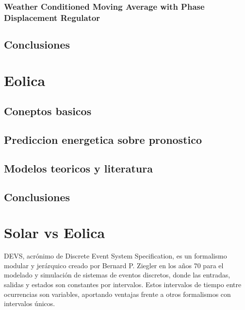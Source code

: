 \subsubsection{ Weather Conditioned Moving Average with Phase Displacement Regulator} %
\label{ssub:subsubsection_name}


\subsection{Conclusiones} %
\label{sub:conclusiones}



\section{Eolica} %
\label{sec:eolica}


\subsection{Coneptos basicos} %
\label{sub:coneptos_basicos}

\subsection{Prediccion energetica sobre pronostico} %
\label{sub:prediccion_energetica_sobre_pronostico}


\subsection{Modelos teoricos y literatura} %
\label{sub:modelos_teoricos_y_literatura}


\subsection{Conclusiones} %
\label{sub:conclusiones}



\section{Solar vs Eolica} %
\label{sec:solar_vs_eolica}






DEVS, acrónimo de Discrete Event System Specification, es un formalismo modular y jerárquico creado por Bernard P. Ziegler en los años 70 para el modelado y simulación de sistemas de eventos discretos, donde las entradas, salidas y estados son constantes por intervalos. Estos intervalos de tiempo entre ocurrencias son variables, aportando ventajas frente a otros formalismos con intervalos únicos.

